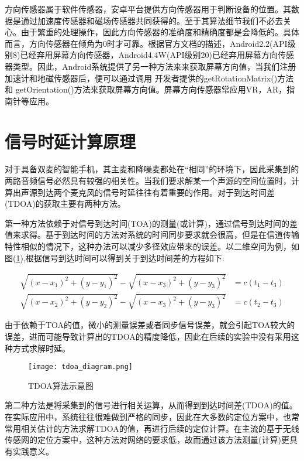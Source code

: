 \documentclass[winfonts,oneside]{njuthesis}
\begin{document}
		方向传感器属于软件传感器，安卓平台提供方向传感器用于判断设备的位置。其数据是通过加速度传感器和磁场传感器共同获得的。至于其算法细节我们不必去关心。由于繁重的处理操作，因此方向传感器的准确度和精确度都是会降低的。具体而言，方向传感器在倾角为0时才可靠。根据官方文档的描述，Android2.2(API级别8)已经弃用屏幕方向传感器，Android4.4W(API级别20)已经弃用屏幕方向传感器类型。因此，Android系统提供了另一种方法来来获取屏幕方向值，当我们注册加速计和地磁传感器后，便可以通过调用 开发者提供的getRotationMatrix()方法和 getOrientation()方法来获取屏幕方向值。屏幕方向传感器常应用VR，AR，指南针等应用。

	
	\section{信号时延计算原理}
	
		对于具备双麦的智能手机，其主麦和降噪麦都处在“相同”的环境下，因此采集到的两路音频信号必然具有较强的相关性。当我们要求解某一个声源的空间位置时，计算出声源到达两个麦克风的信号时延往往有着重要的作用。对于到达时间差(TDOA)的获取主要有两种方法。
		
		第一种方法依赖于对信号到达时间(TOA)的测量(或计算)，通过信号到达时间的差值来求得。基于到达时间的方法对系统的时间同步要求就会很高，但是在信道传输特性相似的情况下，这种办法可以减少多径效应带来的误差。以二维空间为例，如图(\ref{fig: tdoa-diagram}),根据信号到达时间可以得到关于到达时间差的方程如下:
		
		\begin{align}
			\sqrt{(x-x_1)^2+(y-y_1)^2} - \sqrt{(x-x_3)^2+(y-y_3)^2} &= c(t_1-t_3)\\
			\sqrt{(x-x_2)^2+(y-y_2)^2} - \sqrt{(x-x_3)^2+(y-y_3)^2} &= c(t_2-t_3)
		\end{align}
		
		由于依赖于TOA的值，微小的测量误差或者同步信号误差，就会引起TOA较大的误差，进而可能导致计算出的TDOA的精度降低，因此在后续的实验中没有采用这种方式求解时延。
		
		\begin{figure}[H]
			\centering
			\texttt{[image: tdoa\_diagram.png]} 
			\caption{TDOA算法示意图}
			\label{fig: tdoa-diagram}
		\end{figure}
		
		
		第二种方法是将采集到的信号进行相关运算，从而得到到达时间差(TDOA)的值。在实际应用中，系统往往很难做到严格的同步，因此在大多数的定位方案中，也常常用相关估计的方法求解TDOA的值，再进行后续的定位计算。在主流的基于无线传感网的定位方案中，这种方法对网络的要求低，故而通过该方法测量(计算)更具有实践意义。
		
\end{document}
